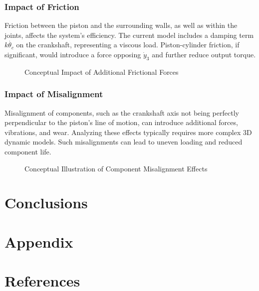 \documentclass[12pt]{article}
\begin{document}
\subsubsection{Impact of Friction}
Friction between the piston and the surrounding walls, as well as within the joints, affects the system's efficiency. The current model includes a damping term \(k \dot{\theta_c}\) on the crankshaft, representing a viscous load. Piston-cylinder friction, if significant, would introduce a force opposing \(\dot{y}_3\) and further reduce output torque.

\begin{figure}[H]
    \centering
    \caption{Conceptual Impact of Additional Frictional Forces}
    \label{fig:friction_concept}
\end{figure}

\subsubsection{Impact of Misalignment}
Misalignment of components, such as the crankshaft axis not being perfectly perpendicular to the piston's line of motion, can introduce additional forces, vibrations, and wear. Analyzing these effects typically requires more complex 3D dynamic models. Such misalignments can lead to uneven loading and reduced component life.

\begin{figure}[H]
    \centering
    \caption{Conceptual Illustration of Component Misalignment Effects}
    \label{fig:misalignment_concept}
\end{figure}

\section{Conclusions}

\section{Appendix}

\section{References}
\end{document}
